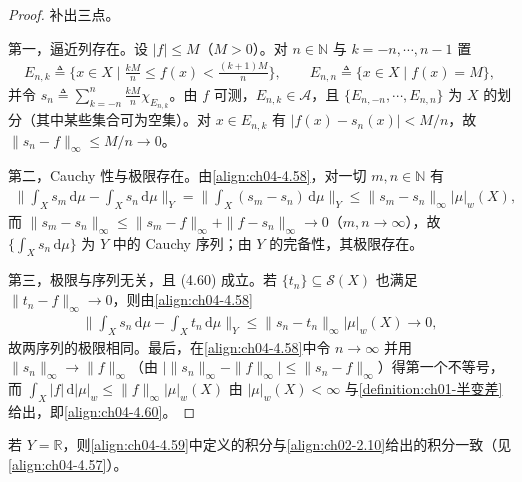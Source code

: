 \documentclass[../../main.tex]{subfiles}%
\begin{document}
\begin{proof}
补出三点。

第一，逼近列存在。设 $|f|\leqslant M$（$M>0$）。对 $n\in\mathbb{N}$ 与 $k=-n,\cdots ,n-1$ 置
\begin{align*}
E_{n,k}\triangleq\Big\{x\in X\mid \frac{kM}{n}\leqslant f(x)<\frac{(k+1)M}{n}\Big\},\qquad E_{n,n}\triangleq\{x\in X\mid f(x)=M\},
\end{align*}
并令 $s_n\triangleq\sum_{k=-n}^{n}\frac{kM}{n}\chi_{E_{n,k}}$。由 $f$ 可测，$E_{n,k}\in\mathcal{A}$，且 $\{E_{n,-n},\cdots ,E_{n,n}\}$ 为 $X$ 的划分（其中某些集合可为空集）。对 $x\in E_{n,k}$ 有 $|f(x)-s_n(x)|<M/n$，故 $\|s_n-f\|_\infty\leqslant M/n\to0$。

第二，Cauchy 性与极限存在。由\eqref{align:ch04-4.58}，对一切 $m,n\in\mathbb{N}$ 有
\begin{align*}
\Big\|\int_X s_m\,\mathrm{d}\mu-\int_X s_n\,\mathrm{d}\mu\Big\|_Y=\Big\|\int_X(s_m-s_n)\,\mathrm{d}\mu\Big\|_Y\leqslant\|s_m-s_n\|_\infty|\mu|_w(X),
\end{align*}
而 $\|s_m-s_n\|_\infty\leqslant\|s_m-f\|_\infty+\|f-s_n\|_\infty\to0$（$m,n\to\infty$），故 $\{\int_X s_n\,\mathrm{d}\mu\}$ 为 $Y$ 中的 Cauchy 序列；由 $Y$ 的完备性，其极限存在。

第三，极限与序列无关，且 (4.60) 成立。若 $\{t_n\}\subseteq\mathcal{S}(X)$ 也满足 $\|t_n-f\|_\infty\to0$，则由\eqref{align:ch04-4.58}
\begin{align*}
\Big\|\int_X s_n\,\mathrm{d}\mu-\int_X t_n\,\mathrm{d}\mu\Big\|_Y\leqslant\|s_n-t_n\|_\infty|\mu|_w(X)\to0,
\end{align*}
故两序列的极限相同。最后，在\eqref{align:ch04-4.58}中令 $n\to\infty$ 并用 $\|s_n\|_\infty\to\|f\|_\infty$（由 $\big|\|s_n\|_\infty-\|f\|_\infty\big|\leqslant\|s_n-f\|_\infty$）得第一个不等号，而 $\int_X|f|\,\mathrm{d}|\mu|_w\leqslant\|f\|_\infty|\mu|_w(X)$ 由 $|\mu|_w(X)<\infty$ 与\cref{definition:ch01-半变差}给出，即\eqref{align:ch04-4.60}。
\end{proof}

\begin{remark}\label{remark:ch04-向量测度积分一致}
若 $Y=\mathbb{R}$，则\eqref{align:ch04-4.59}中定义的积分与\eqref{align:ch02-2.10}给出的积分一致（见\eqref{align:ch04-4.57}）。
\end{remark}
\end{document}
